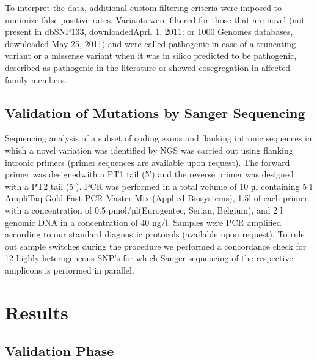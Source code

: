 To interpret the data, additional custom-filtering criteria were imposed to minimize false-positive rates. 
Variants were filtered for those that are novel (not present in dbSNP133, downloadedApril 1, 2011; or 1000 Genomes databases, downloaded May 25, 2011) and were called pathogenic in case of a truncating variant or a missense variant when it was in silico predicted to be pathogenic, described as pathogenic in the literature or showed cosegregation in affected family members.

\subsection{Validation of Mutations by Sanger Sequencing}
Sequencing analysis of a subset of coding exons and flanking intronic sequences in which a novel variation was identified by NGS was carried out using flanking intronic primers (primer sequences are available upon request). 
The forward primer was designedwith a PT1 tail (5') and the reverse primer was designed with a PT2 tail (5'). 
PCR was performed in a total volume of 10 µl containing 5 {\textmu}l AmpliTaq Gold {\textregistered}Fast PCR Master Mix (Applied Biosystems), 1.5{\textmu}l of each primer with a concentration of 0.5 pmol/µl(Eurogentec, Serian, Belgium), and 2 {\textmu}l genomic DNA in a concentration of 40 ng/{\textmu}l. 
Samples were PCR amplified according to our standard diagnostic protocols (available upon request). 
To rule out sample switches during the procedure we performed a concordance check for 12 highly heterogeneous SNP’s for which Sanger sequencing of the respective amplicons is performed in parallel.

\section{Results}\label{results}

\subsection{Validation Phase}

